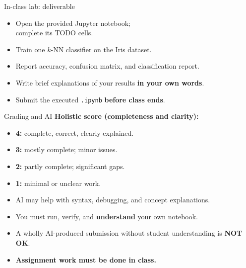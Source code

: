 \documentclass[aspectratio=43,11pt]{beamer}
\begin{document}
\begin{frame}{In-class lab: deliverable}
\begin{itemize}
  \item Open the provided Jupyter notebook;\\complete its TODO cells.
  \item Train one $k$-NN classifier on the Iris dataset.
  \item Report accuracy, confusion matrix, and classification report.
  \item Write brief explanations of your results \textbf{in your own words}.
  \item Submit the executed \texttt{.ipynb} \textbf{before class ends}.
\end{itemize}
\end{frame}

\begin{frame}{Grading and AI}
\textbf{Holistic score (completeness and clarity):}
\begin{itemize}
  \item \textbf{4:} complete, correct, clearly explained.
  \item \textbf{3:} mostly complete; minor issues.
  \item \textbf{2:} partly complete; significant gaps.
  \item \textbf{1:} minimal or unclear work.
\end{itemize}
\medskip
\begin{itemize}
  \item AI may help with syntax, debugging, and concept explanations.
  \item You must run, verify, and \textbf{understand} your own notebook.
  \item A wholly AI-produced submission without student understanding is \textbf{NOT OK}.
  \item \textbf{Assignment work must be done in class.}
\end{itemize}
\end{frame}
\end{document}
